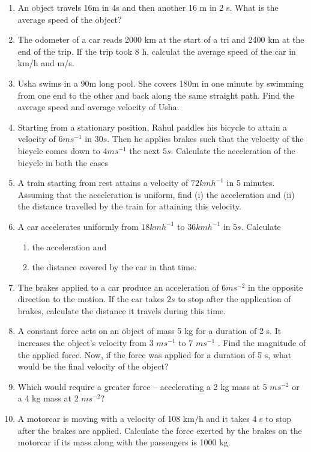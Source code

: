 \renewcommand{\theequation}{\theenumi}
\begin{enumerate}[label=\arabic*.,ref=\thesection.\theenumi]
%
%
\item  An object travels 16m in 4s and then another 16 m in 2 s. What is the average speed of the object?
\item  The odometer of a car reads 2000 km at the start of a tri and 2400 km at the end of the trip.  If the trip took 8 h, calculat the average speed of the car in km/h and m/s.
\item  Usha swims in a 90m long pool.  She covers 180m in one minute by swimming from one end to the other and back along the same straight path.  Find the average speed and average velocity of Usha.
\item  Starting from a stationary position, Rahul paddles his bicycle to
attain a velocity of $6 m s^{-1}$ in $30 s$. Then
he applies brakes such that the velocity of the bicycle comes down to $4 m s^{-1}$
the next $5 s$. Calculate the acceleration of the bicycle in both the cases
%
\item  A train starting from rest attains a velocity of $72 km h^{-1}$
in
5 minutes. Assuming that the acceleration is uniform, find (i) the acceleration and (ii) the distance travelled by the train for attaining this velocity.
%
\item  A car accelerates uniformly from $18 km h
^{-1}$ to $36 km h^{-1}$ in $5 s$. 
Calculate 
\begin{enumerate}
\item  the acceleration and 
\item   the distance covered by the car in that time.
\end{enumerate}
%
\item  The brakes applied to a car produce an acceleration of $6 m s^{-2}$
in
the opposite direction to the motion. If the car takes $2 s$ to stop after the application of brakes, calculate the distance it travels during this time.
%
\item  A constant force acts on an object of mass 5 kg for a duration of 2 s. It increases the object’s velocity from 3 $m s^{-1}$
to 7 $m s^{-1}$ . Find the
magnitude of the applied force. Now, if the force was applied for a duration of 5 s, what would be the final velocity of the object?
\item  Which would require a greater force -- accelerating a 2 kg mass at 5 $m s^{-2}$
or a 4 kg mass at 2 $m s^{-2}$?
\item  A motorcar is moving with a velocity of 108 km/h and it takes 4 s to stop after the brakes are applied. Calculate the force exerted by the brakes on the motorcar if its mass along with the passengers is 1000 kg.

\end{enumerate}
